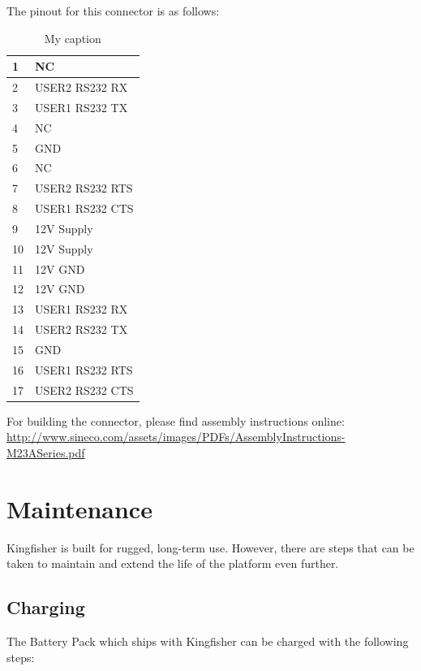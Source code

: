 \documentclass[]{clearpath-latex/clearpath-manual}
\begin{document}
\begin{enumerate}[nolistsep]
\begin{enumerate}[nolistsep]
The pinout for this connector is as follows:

\begin{table}[]
\centering
\caption{My caption}
\label{my-label}
\begin{tabular}{|l|l|}
\hline
1  & NC              \\ \hline
2  & USER2 RS232 RX  \\ \hline
3  & USER1 RS232 TX  \\ \hline
4  & NC              \\ \hline
5  & GND             \\ \hline
6  & NC              \\ \hline
7  & USER2 RS232 RTS \\ \hline
8  & USER1 RS232 CTS \\ \hline
9  & 12V Supply      \\ \hline
10 & 12V Supply      \\ \hline
11 & 12V GND         \\ \hline
12 & 12V GND         \\ \hline
13 & USER1 RS232 RX  \\ \hline
14 & USER2 RS232 TX  \\ \hline
15 & GND             \\ \hline
16 & USER1 RS232 RTS \\ \hline
17 & USER2 RS232 CTS \\ \hline
\end{tabular}
\end{table}

For building the connector, please find assembly instructions online: \url{http://www.sineco.com/assets/images/PDFs/AssemblyInstructions-M23ASeries.pdf}

\newpage

\section{Maintenance}
Kingfisher is built for rugged, long-term use. However, there are steps that can be taken to maintain and extend the life of the platform even further.

\subsection{Charging}
The Battery Pack which ships with Kingfisher can be charged with the following steps:


\end{enumerate}
\end{enumerate}
\end{document}
